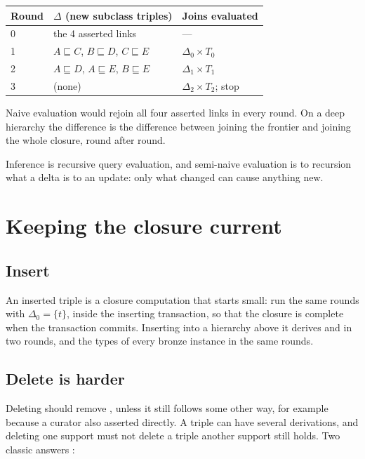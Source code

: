 \begin{center}
\begin{tabular}{@{}lll@{}}
\toprule
Round & $\Delta$ (new subclass triples) & Joins evaluated \\
\midrule
0 & the 4 asserted links & --- \\
1 & $A{\sqsubseteq}C$, $B{\sqsubseteq}D$, $C{\sqsubseteq}E$ & $\Delta_0 \times T_0$ \\
2 & $A{\sqsubseteq}D$, $A{\sqsubseteq}E$, $B{\sqsubseteq}E$ & $\Delta_1 \times T_1$ \\
3 & (none) & $\Delta_2 \times T_2$; stop \\
\bottomrule
\end{tabular}
\end{center}

Naive evaluation would rejoin all four asserted links in every round. On a
deep hierarchy the difference is the difference between joining the frontier
and joining the whole closure, round after round.

\begin{keyidea}
Inference is recursive query evaluation, and semi-naive evaluation is to
recursion what a delta is to an update: only what changed can cause anything
new.
\end{keyidea}

\section{Keeping the closure current}

\subsection{Insert}

An inserted triple is a closure computation that starts small: run the same
rounds with $\Delta_0 = \{t\}$, inside the inserting transaction, so that the
closure is complete when the transaction commits. Inserting
 into a hierarchy above it derives  and  in two rounds, and the
types of every bronze instance in the same rounds.

\subsection{Delete is harder}

Deleting  should remove , unless it still follows some other way, for example because a
curator also asserted  directly. A triple can
have several derivations, and deleting one support must not delete a triple
another support still holds. Two classic answers \cite{gupta1993}:

